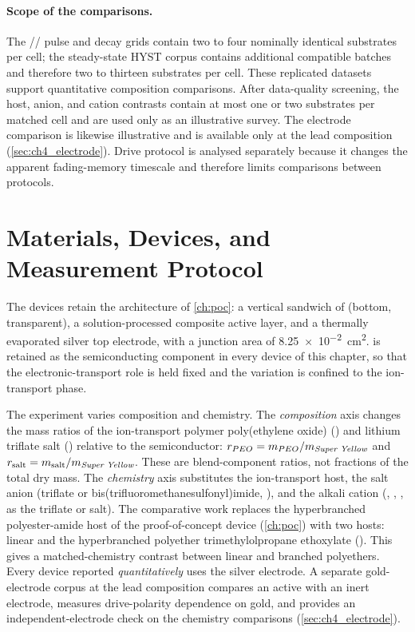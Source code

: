 \documentclass[12pt, twoside]{report}
\begin{document}
\paragraph{Scope of the comparisons.} The \SY{}/\PEO{}/\LiTf{} pulse and decay grids contain two to four nominally identical substrates per cell; the steady-state HYST corpus contains additional compatible batches and therefore two to thirteen substrates per cell. These replicated datasets support quantitative composition comparisons. After data-quality screening, the host, anion, and cation contrasts contain at most one or two substrates per matched cell and are used only as an illustrative survey. The electrode comparison is likewise illustrative and is available only at the lead composition (\cref{sec:ch4_electrode}). Drive protocol is analysed separately because it changes the apparent fading-memory timescale and therefore limits comparisons between protocols.

\section{Materials, Devices, and Measurement Protocol}\label{sec:ch4_materials}

The devices retain the architecture of \cref{ch:poc}: a vertical \twoterminal{} sandwich of \ITO{} (bottom, transparent), a solution-processed composite active layer, and a thermally evaporated silver top electrode, with a junction area of \SI{8.25e-2}{\centi\meter\squared}. \SY{} is retained as the semiconducting component in every device of this chapter, so that the electronic-transport role is held fixed and the variation is confined to the ion-transport phase.

The experiment varies composition and chemistry. The \emph{composition} axis changes the mass ratios of the ion-transport polymer poly(ethylene oxide) (\PEO{}) and lithium triflate salt (\LiTf{}) relative to the semiconductor: \(r_{PEO{}}=m_{PEO{}}/m_{\textit{Super Yellow}{}}\) and \(r_{\mathrm{salt}}=m_{\mathrm{salt}}/m_{\textit{Super Yellow}{}}\). These are blend-component ratios, not fractions of the total dry mass. The \emph{chemistry} axis substitutes the ion-transport host, the salt anion (triflate or bis(trifluoromethanesulfonyl)imide, \TFSI{}), and the alkali cation (, , , as the triflate or \TFSI{} salt). The comparative work replaces the hyperbranched polyester-amide \Hybrane{} host of the proof-of-concept device (\cref{ch:poc}) with two hosts: linear \PEO{} and the hyperbranched polyether trimethylolpropane ethoxylate (\TMPE{}). This gives a matched-chemistry contrast between linear and branched polyethers. Every device reported \emph{quantitatively} uses the silver electrode. A separate gold-electrode corpus at the lead composition compares an active with an inert electrode, measures drive-polarity dependence on gold, and provides an independent-electrode check on the chemistry comparisons (\cref{sec:ch4_electrode}).
\end{document}
